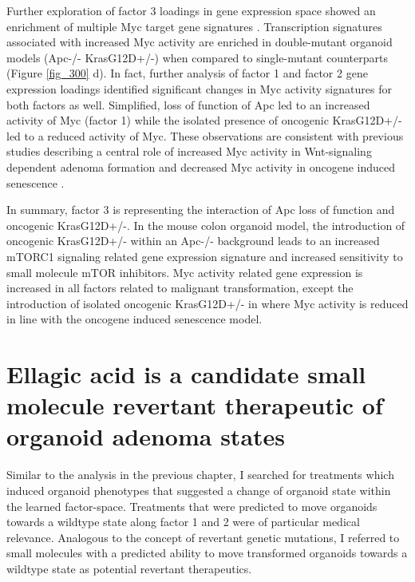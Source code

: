 \begin{flushleft}
\smallbreak
Further exploration of factor 3 loadings in gene expression space showed an enrichment of multiple Myc target gene signatures \cite{Yu2005-em, Zeller2003-ok}. Transcription signatures associated with increased Myc activity are enriched in double-mutant organoid models (Apc-/- KrasG12D+/-) when compared to single-mutant counterparts (Figure \ref{fig_300} d). In fact, further analysis of factor 1 and factor 2 gene expression loadings identified significant changes in Myc activity signatures for both factors as well. Simplified, loss of function of Apc led to an increased activity of Myc (factor 1) while the isolated presence of oncogenic KrasG12D+/- led to a reduced activity of Myc. These observations are consistent with previous studies describing a central role of increased Myc activity in Wnt-signaling dependent adenoma formation \cite{Satoh2017-nd} and decreased Myc activity in oncogene induced senescence \cite{Yao2018-ut}.

\smallbreak
In summary, factor 3 is representing the interaction of Apc loss of function and oncogenic KrasG12D+/-. In the mouse colon organoid model, the introduction of oncogenic KrasG12D+/- within an Apc-/- background leads to an increased mTORC1 signaling related gene expression signature and increased sensitivity to small molecule mTOR inhibitors. Myc activity related gene expression is increased in all factors related to malignant transformation, except the introduction of isolated oncogenic KrasG12D+/- in where Myc activity is reduced in line with the oncogene induced senescence model. 

\newpage
\section{Ellagic acid is a candidate small molecule revertant therapeutic of organoid adenoma states}

Similar to the analysis in the previous chapter, I searched for treatments which induced organoid phenotypes that suggested a change of organoid state within the learned factor-space. Treatments that were predicted to move organoids towards a wildtype state along factor 1 and 2 were of particular medical relevance. Analogous to the concept of revertant genetic mutations, I referred to small molecules with a predicted ability to move transformed organoids towards a wildtype state as potential revertant therapeutics.


\end{flushleft}
